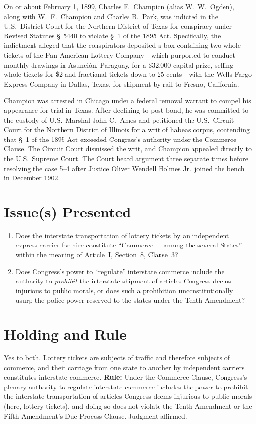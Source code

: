 \documentclass[12pt]{article}
\begin{document}
On or about February 1, 1899, Charles F.\ Champion (alias W.\ W.\ Ogden), along with W.\ F.\ Champion and Charles B.\ Park, was indicted in the U.S.\ District Court for the Northern District of Texas for conspiracy under Revised Statutes \S~5440 to violate \S~1 of the 1895 Act. Specifically, the indictment alleged that the conspirators deposited a box containing two whole tickets of the Pan-American Lottery Company---which purported to conduct monthly drawings in Asunci\'{o}n, Paraguay, for a \$32,000 capital prize, selling whole tickets for \$2 and fractional tickets down to 25 cents---with the Wells-Fargo Express Company in Dallas, Texas, for shipment by rail to Fresno, California.

Champion was arrested in Chicago under a federal removal warrant to compel his appearance for trial in Texas. After declining to post bond, he was committed to the custody of U.S.\ Marshal John C.\ Ames and petitioned the U.S.\ Circuit Court for the Northern District of Illinois for a writ of habeas corpus, contending that \S~1 of the 1895 Act exceeded Congress's authority under the Commerce Clause. The Circuit Court dismissed the writ, and Champion appealed directly to the U.S.\ Supreme Court. The Court heard argument three separate times before resolving the case 5--4 after Justice Oliver Wendell Holmes Jr.\ joined the bench in December 1902.

\section{Issue(s) Presented}
\begin{enumerate}
  \item Does the interstate transportation of lottery tickets by an independent express carrier for hire constitute ``Commerce \dots\ among the several States'' within the meaning of Article~I, Section~8, Clause~3?
  \item Does Congress's power to ``regulate'' interstate commerce include the authority to \textit{prohibit} the interstate shipment of articles Congress deems injurious to public morals, or does such a prohibition unconstitutionally usurp the police power reserved to the states under the Tenth Amendment?
\end{enumerate}

\section{Holding and Rule}
Yes to both. Lottery tickets are subjects of traffic and therefore subjects of commerce, and their carriage from one state to another by independent carriers constitutes interstate commerce. \textbf{Rule:} Under the Commerce Clause, Congress's plenary authority to regulate interstate commerce includes the power to prohibit the interstate transportation of articles Congress deems injurious to public morals (here, lottery tickets), and doing so does not violate the Tenth Amendment or the Fifth Amendment's Due Process Clause. Judgment affirmed.
\end{document}
